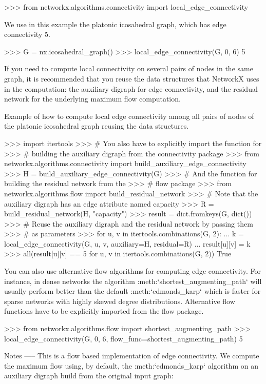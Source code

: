 \begin{DoxyVerb}
>>> from networkx.algorithms.connectivity import local_edge_connectivity

We use in this example the platonic icosahedral graph, which has edge
connectivity 5.

>>> G = nx.icosahedral_graph()
>>> local_edge_connectivity(G, 0, 6)
5

If you need to compute local connectivity on several pairs of
nodes in the same graph, it is recommended that you reuse the
data structures that NetworkX uses in the computation: the
auxiliary digraph for edge connectivity, and the residual
network for the underlying maximum flow computation.

Example of how to compute local edge connectivity among
all pairs of nodes of the platonic icosahedral graph reusing
the data structures.

>>> import itertools
>>> # You also have to explicitly import the function for
>>> # building the auxiliary digraph from the connectivity package
>>> from networkx.algorithms.connectivity import build_auxiliary_edge_connectivity
>>> H = build_auxiliary_edge_connectivity(G)
>>> # And the function for building the residual network from the
>>> # flow package
>>> from networkx.algorithms.flow import build_residual_network
>>> # Note that the auxiliary digraph has an edge attribute named capacity
>>> R = build_residual_network(H, "capacity")
>>> result = dict.fromkeys(G, dict())
>>> # Reuse the auxiliary digraph and the residual network by passing them
>>> # as parameters
>>> for u, v in itertools.combinations(G, 2):
...     k = local_edge_connectivity(G, u, v, auxiliary=H, residual=R)
...     result[u][v] = k
>>> all(result[u][v] == 5 for u, v in itertools.combinations(G, 2))
True

You can also use alternative flow algorithms for computing edge
connectivity. For instance, in dense networks the algorithm
:meth:`shortest_augmenting_path` will usually perform better than
the default :meth:`edmonds_karp` which is faster for sparse
networks with highly skewed degree distributions. Alternative flow
functions have to be explicitly imported from the flow package.

>>> from networkx.algorithms.flow import shortest_augmenting_path
>>> local_edge_connectivity(G, 0, 6, flow_func=shortest_augmenting_path)
5

Notes
-----
This is a flow based implementation of edge connectivity. We compute the
maximum flow using, by default, the :meth:`edmonds_karp` algorithm on an
auxiliary digraph build from the original input graph:


\end{DoxyVerb}
